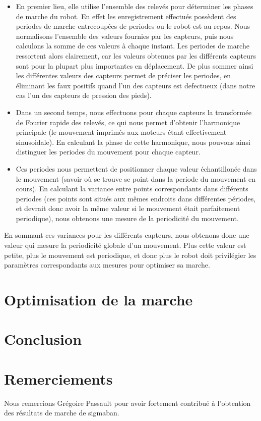 \documentclass[11pt]{article}
\begin{document}
\begin{itemize}
\item En premier lieu, elle utilise l'ensemble des relevés pour déterminer les phases de marche du robot. En effet les enregistrement effectués possèdent des periodes de marche entrecoupées de periodes ou le robot est au repos. Nous normalisons l'ensemble des valeurs fournies par les capteurs, puis nous calculons la somme de ces valeurs à chaque instant. Les periodes de marche ressortent alors clairement, car les valeurs obtenues par les différents capteurs sont pour la plupart plus importantes en déplacement. De plus sommer ainsi les différentes valeurs des capteurs permet de préciser les periodes, en éliminant les faux positifs quand l'un des capteurs est defectueux (dans notre cas l'un des capteurs de pression des pieds).
\item Dans un second temps, nous effectuons pour chaque capteurs la transformée de Fourier rapide des relevés, ce qui nous permet d'obtenir l'harmonique principale (le mouvement imprimés aux moteurs étant effectivement sinusoidale). En calculant la phase de cette harmonique, nous pouvons ainsi distinguer les periodes du mouvement pour chaque capteur.
\item Ces periodes nous permettent de positionner chaque valeur échantillonée dans le mouvement (savoir où se trouve se point dans la periode du mouvement en cours). En calculant la variance entre points correspondants dans différents periodes (ces points sont situés aux mêmes endroits dans différentes périodes, et devrait donc avoir la même valeur si le mouvement était parfaitement periodique), nous obtenons une mesure de la periodicité du mouvement. 
\end{itemize}
En sommant ces variances pour les différents capteurs,
nous obtenons donc une valeur qui mesure la periodicité globale d'un mouvement. Plus cette valeur est petite, plus le mouvement est periodique, et donc plus le robot doit privilégier les paramètres correspondants aux mesures pour optimiser sa marche. 

\section{Optimisation de la marche}
\section{Conclusion}

\section{Remerciements}
Nous remercions Grégoire Passault pour avoir fortement contribué à l'obtention des résultats de marche de sigmaban.
\end{document}
